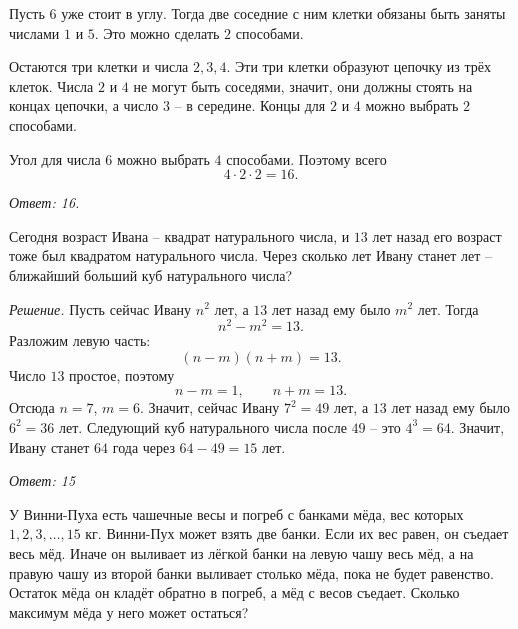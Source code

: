 Пусть $6$ уже стоит в углу. Тогда две соседние с ним клетки обязаны быть заняты числами $1$ и $5$. Это можно сделать $2$ способами.

Остаются три клетки и числа $2,3,4$. Эти три клетки образуют цепочку из трёх клеток. Числа $2$ и $4$ не могут быть соседями, значит, они должны стоять на концах цепочки, а число $3$ -- в середине. Концы для $2$ и $4$ можно выбрать $2$ способами.

Угол для числа $6$ можно выбрать $4$ способами. Поэтому всего
\[
4\cdot 2\cdot 2=16.
\]

\textit{Ответ: 16.}


Сегодня возраст Ивана -- квадрат натурального числа, и $13$ лет назад его возраст тоже был квадратом натурального числа. Через сколько лет Ивану станет лет -- ближайший больший куб натурального числа?

\textit{Решение.}
Пусть сейчас Ивану $n^2$ лет, а $13$ лет назад ему было $m^2$ лет. Тогда
\[
n^2-m^2=13.
\]
Разложим левую часть:
\[
(n-m)(n+m)=13.
\]
Число $13$ простое, поэтому
\[
n-m=1,\qquad n+m=13.
\]
Отсюда $n=7$, $m=6$. Значит, сейчас Ивану $7^2=49$ лет, а $13$ лет назад ему было $6^2=36$ лет. Следующий куб натурального числа после $49$ -- это $4^3=64.$ Значит, Ивану станет $64$ года через $64-49=15$ лет.

\textit{Ответ: 15}

У Винни-Пуха есть чашечные весы и погреб с банками мёда, вес которых $1,2,3,\ldots,15$ кг. Винни-Пух может взять две банки. Если их вес равен, он съедает весь мёд. Иначе он выливает из лёгкой банки на левую чашу весь мёд, а на правую чашу из второй банки выливает столько мёда, пока не будет равенство. Остаток мёда он кладёт обратно в погреб, а мёд с весов съедает. Сколько максимум мёда у него может остаться?

\begin{center}
\end{center}


